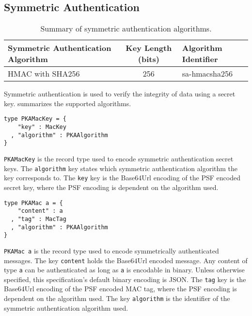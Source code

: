 \documentclass{article}
\newcommand{\todo}[1]{\textcolor{red}{#1}}
\begin{document}
%
%
%
%

\subsection{Symmetric Authentication}

\begin{table}
\begin{center}
\begin{tabular}{| l | c | l |}
\hline
Symmetric Authentication Algorithm & Key Length (bits) & Algorithm Identifier \\ 
\hline
HMAC with SHA256 & 256 & sa-hmacsha256 \\
\hline
\end{tabular}
\end{center}
\caption{Summary of symmetric authentication algorithms.}
\label{table:symmetric_auth_alg}
\end{table}

Symmetric authentication is used to verify the integrity of data using a secret key. 
 summarizes the supported algorithms. 

\begin{lstlisting}
type PKAMacKey = {
    "key" : MacKey
  , "algorithm" : PKAAlgorithm
}
\end{lstlisting}

\texttt{PKAMacKey} is the record type used to encode symmetric authentication secret keys. 
The \texttt{algorithm} key states which symmetric authentication algorithm the key corresponds to. 
The \texttt{key} key is the Base64Url encoding of the PSF encoded secret key, where the PSF encoding is dependent on the algorithm used. 

\begin{lstlisting}
type PKAMac a = {
    "content" : a
  , "tag" : MacTag
  , "algorithm" : PKAAlgorithm
}
\end{lstlisting}

\texttt{PKAMac a} is the record type used to encode symmetrically authenticated messages. 
The key \texttt{content} holds the Base64Url encoded message. 
Any content of type \texttt{a} can be authenticated as long as \texttt{a} is encodable in binary. 
Unless otherwise specified, this specification's default binary encoding is JSON. 
The \texttt{tag} key is the Base64Url encoding of the PSF encoded MAC tag, where the PSF encoding is dependent on the algorithm used. 
The key \texttt{algorithm} is the identifier of the symmetric authentication algorithm used. 
\end{document}
